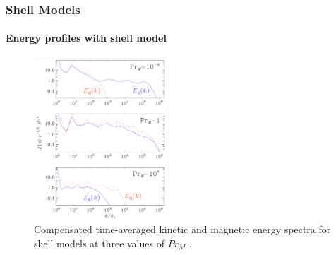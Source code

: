 \documentclass{beamer}
\begin{document}
\begin{frame}
 \frametitle{Shell Models}
 \framesubtitle{Energy profiles with shell model}
  
   \begin{figure}[t]
  \includegraphics[width=5cm]{img/E_B_profile}
  \caption{Compensated time-averaged kinetic and magnetic energy spectra for
shell models at three values of $Pr_M$ \cite{brandenburg2014magnetic}.}
  \centering
 \end{figure}
  
\end{frame}
\end{document}
